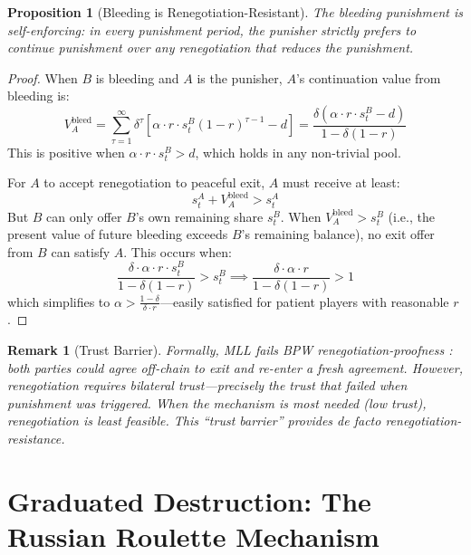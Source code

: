 \documentclass[12pt,a4paper]{article}
\newtheorem{proposition}{Proposition}
\newtheorem{remark}{Remark}
\begin{document}
\begin{proposition}[Bleeding is Renegotiation-Resistant]
\label{prop:reneg}
The bleeding punishment is self-enforcing: in every punishment period, the punisher strictly prefers to continue punishment over any renegotiation that reduces the punishment.
\end{proposition}

\begin{proof}
When $B$ is bleeding and $A$ is the punisher, $A$'s continuation value from bleeding is:
\[
V_A^{\text{bleed}} = \sum_{\tau=1}^{\infty} \delta^\tau \left[\alpha \cdot r \cdot s_t^B (1-r)^{\tau-1} - d\right]
= \frac{\delta(\alpha \cdot r \cdot s_t^B - d)}{1 - \delta(1-r)}
\]
This is positive when $\alpha \cdot r \cdot s_t^B > d$, which holds in any non-trivial pool.

For $A$ to accept renegotiation to peaceful exit, $A$ must receive at least:
\[
s_t^A + V_A^{\text{bleed}} > s_t^A
\]
But $B$ can only offer $B$'s own remaining share $s_t^B$. When $V_A^{\text{bleed}} > s_t^B$ (i.e., the present value of future bleeding exceeds $B$'s remaining balance), no exit offer from $B$ can satisfy $A$. This occurs when:
\[
\frac{\delta \cdot \alpha \cdot r \cdot s_t^B}{1 - \delta(1-r)} > s_t^B \implies \frac{\delta \cdot \alpha \cdot r}{1 - \delta(1-r)} > 1
\]
which simplifies to $\alpha > \frac{1-\delta}{\delta \cdot r}$---easily satisfied for patient players with reasonable $r$.
\end{proof}

\begin{remark}[Trust Barrier]
Formally, MLL fails BPW renegotiation-proofness \citep{hart1988}: both parties could agree off-chain to exit and re-enter a fresh agreement. However, renegotiation requires \textit{bilateral trust}---precisely the trust that failed when punishment was triggered. When the mechanism is most needed (low trust), renegotiation is least feasible. This ``trust barrier'' provides de facto renegotiation-resistance.
\end{remark}



\section{Graduated Destruction: The Russian Roulette Mechanism}
\label{sec:roulette}
\end{document}

